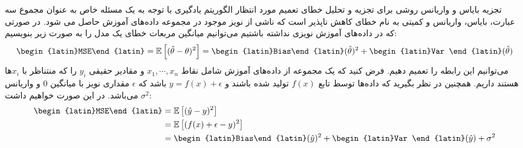 تجزیه بایاس و واریانس روشی برای تجزیه و تحلیل خطای تعمیم مورد انتظار الگوریتم یادگیری با توجه به یک مسئله خاص به عنوان مجموع سه عبارت، بایاس، واریانس و کمیتی به نام خطای کاهش ناپذیر است که ناشی از نویز موجود در مجموعه داده‌های آموزش حاصل می شود.
در صورتی که در داده‌های آموزش نویزی نداشته باشتیم
می‌توانیم میانگین مربعات خطای یک مدل را به صورت زیر بنویسیم:
 $$\text{\begin{latin}MSE\end{latin}} = \mathbb{E}\left[(\hat{\theta} - \theta)^2 \right] = \text{\begin{latin}Bias\end{latin}}(\hat{\theta})^2 + \text{\begin{latin}Var
 \end{latin}}(\hat{\theta})$$
 می‌توانیم این رابطه را تعمیم دهیم. فرض کنید که یک مجموعه از داده‌های آموزش شامل نقاط 
 $x_1, \cdots , x_n$ 
 و مقادیر حقیقی $y_i$ را که منتناظر با $x_i$ها هستند داریم.
 همچنین در نظر بگیرید که داده‌ها توسط تابع $f(x)$ تولید شده باشند و $y = f(x) + \epsilon$ باشد که $\epsilon$ مقداری نویز با میانگین $0$ و واریانس $\sigma^2$ می‌باشد. در این صورت خواهیم داشت:
 \begin{align*}
     \text{\begin{latin}MSE\end{latin}} & = \mathbb{E}\left[(\hat{y} - y)^2\right] \\
     & =  \mathbb{E}\left[(f(x) + \epsilon - y)^2\right] \\ 
     & = \text{\begin{latin}Bias\end{latin}}(\hat{y})^2 + \text{\begin{latin}Var
 \end{latin}}(\hat{y}) + \sigma^2
 \end{align*}   